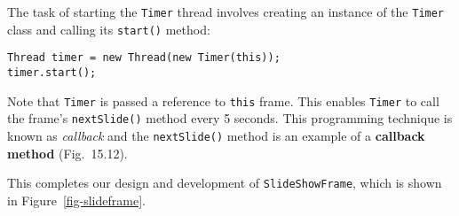 
The task of starting the {\tt Timer} thread involves creating an
instance of the {\tt Timer} class and calling its {\tt start()}
method:

\begin{jjjlisting}
\begin{lstlisting}
Thread timer = new Thread(new Timer(this));
timer.start();
\end{lstlisting}
\end{jjjlisting}

\noindent Note that {\tt Timer} is passed a reference to
{\tt this} frame.  This enables {\tt Timer} to call the frame's
{\tt nextSlide()} method every 5 seconds.   This programming technique is
known as {\it callback} and the {\tt nextSlide()} method is an example
of a {\bf callback method} (Fig.~15.12).


\noindent This completes our design and development
of {\tt SlideShowFrame}, which is shown in Figure~\ref{fig-slideframe}.

